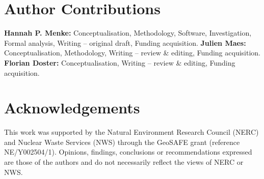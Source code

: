 \section*{Author Contributions}

\textbf{Hannah P. Menke:} Conceptualisation, Methodology, Software, Investigation,
Formal analysis, Writing -- original draft, Funding acquisition.
\textbf{Julien Maes:} Conceptualisation, Methodology, Writing -- review \& editing,
Funding acquisition.
\textbf{Florian Doster:} Conceptualisation, Writing -- review \& editing, Funding acquisition.

\section*{Acknowledgements}

This work was supported by the Natural Environment Research Council (NERC) and
Nuclear Waste Services (NWS) through the GeoSAFE grant (reference
NE/Y002504/1). Opinions, findings, conclusions or recommendations expressed are
those of the authors and do not necessarily reflect the views of NERC
or NWS.
